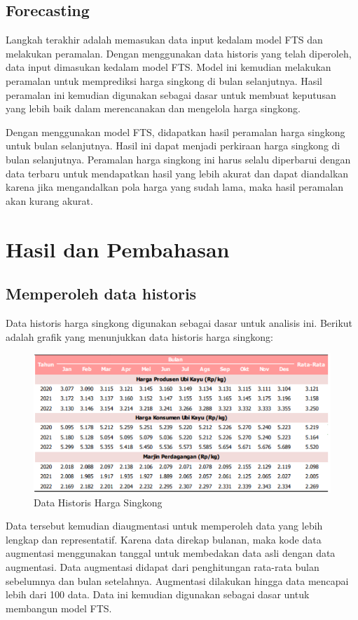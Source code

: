 \documentclass[conference]{IEEEtran}
\begin{document}
    
\subsection{Forecasting}
Langkah terakhir adalah memasukan data input kedalam model FTS dan melakukan peramalan. Dengan menggunakan data historis yang telah diperoleh, data input dimasukan kedalam model FTS. Model ini kemudian melakukan peramalan untuk memprediksi harga singkong di bulan selanjutnya. Hasil peramalan ini kemudian digunakan sebagai dasar untuk membuat keputusan yang lebih baik dalam merencanakan dan mengelola harga singkong. 

Dengan menggunakan model FTS, didapatkan hasil peramalan harga singkong untuk bulan selanjutnya. Hasil ini dapat menjadi perkiraan harga singkong di bulan selanjutnya. Peramalan harga singkong ini harus selalu diperbarui dengan data terbaru untuk mendapatkan hasil yang lebih akurat dan dapat diandalkan karena jika mengandalkan pola harga yang sudah lama, maka hasil peramalan akan kurang akurat.


\section{Hasil dan Pembahasan}

\subsection{Memperoleh data historis}
Data historis harga singkong digunakan sebagai dasar untuk analisis ini. Berikut adalah grafik yang menunjukkan data historis harga singkong:
\begin{figure}[H]
    \centering
    \includegraphics[width=\columnwidth]{images/Data Historis.png} 
    \caption{Data Historis Harga Singkong}
\end{figure}
Data tersebut kemudian diaugmentasi untuk memperoleh data yang lebih lengkap dan representatif. Karena data direkap bulanan, maka kode data augmentasi menggunakan tanggal untuk membedakan data asli dengan data augmentasi. Data augmentasi didapat dari penghitungan rata-rata bulan sebelumnya dan bulan setelahnya. Augmentasi dilakukan hingga data mencapai lebih dari 100 data. Data ini kemudian digunakan sebagai dasar untuk membangun model FTS.
\end{document}
